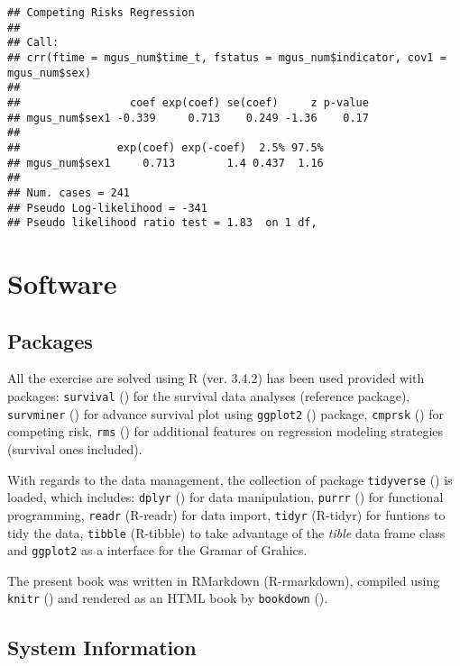 \documentclass[]{book}
\theoremstyle{definition}
\theoremstyle{definition}
\theoremstyle{definition}
\theoremstyle{remark}
\begin{document}
\begin{verbatim}
## Competing Risks Regression
## 
## Call:
## crr(ftime = mgus_num$time_t, fstatus = mgus_num$indicator, cov1 = mgus_num$sex)
## 
##                 coef exp(coef) se(coef)     z p-value
## mgus_num$sex1 -0.339     0.713    0.249 -1.36    0.17
## 
##               exp(coef) exp(-coef)  2.5% 97.5%
## mgus_num$sex1     0.713        1.4 0.437  1.16
## 
## Num. cases = 241
## Pseudo Log-likelihood = -341 
## Pseudo likelihood ratio test = 1.83  on 1 df,
\end{verbatim}

\chapter*{Software}\label{software}

\section*{Packages}\label{packages}

All the exercise are solved using R (ver. 3.4.2) has been used provided
with packages: \texttt{survival} (\citet{R-survival}) for the survival
data analyses (reference package), \texttt{survminer}
(\citet{R-survminer}) for advance survival plot using \texttt{ggplot2}
(\citet{R-ggplot2}) package, \texttt{cmprsk} (\citet{R-cmprsk}) for
competing risk, \texttt{rms} (\citet{R-rms}) for additional features on
regression modeling strategies (survival ones included).

With regards to the data management, the collection of package
\texttt{tidyverse} (\citet{R-tidyverse}) is loaded, which includes:
\texttt{dplyr} (\citet{R-dplyr}) for data manipulation, \texttt{purrr}
(\citet{R-purrr}) for functional programming, \texttt{readr} (R-readr)
for data import, \texttt{tidyr} (R-tidyr) for funtions to tidy the data,
\texttt{tibble} (R-tibble) to take advantage of the \emph{tible} data
frame class and \texttt{ggplot2} as a interface for the Gramar of
Grahics.

The present book was written in RMarkdown (R-rmarkdown), compiled using
\texttt{knitr} (\citet{R-knitr}) and rendered as an HTML book by
\texttt{bookdown} (\citet{R-bookdown}).

\section*{System Information}\label{system-information}
\end{document}
